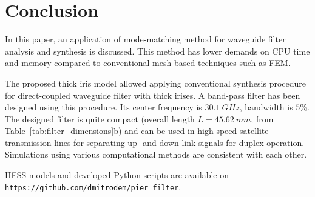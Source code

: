 \documentclass{pj}
\begin{document}
\section{Conclusion}
\label{sec:conclusion}
In this paper, an application of mode-matching method for waveguide
filter analysis and synthesis is discussed. This method has lower
demands on CPU time and memory compared to conventional mesh-based
techniques such as FEM.

The proposed thick iris model allowed applying conventional synthesis
procedure for direct-coupled waveguide filter with thick irises. A
band-pass filter has been designed using this procedure. Its center
frequency is $30.1~GHz$, bandwidth is $5\%$. The designed filter is
quite compact (overall length $L = 45.62~mm$, from
Table~\ref{tab:filter_dimensions}b) and can be used in high-speed
satellite transmission lines for separating up- and down-link signals
for duplex operation. Simulations using various computational methods
are consistent with each other.

HFSS models and developed Python scripts are available on
\texttt{https://github.com/dmitrodem/pier\_filter}.

{}

\end{document}
